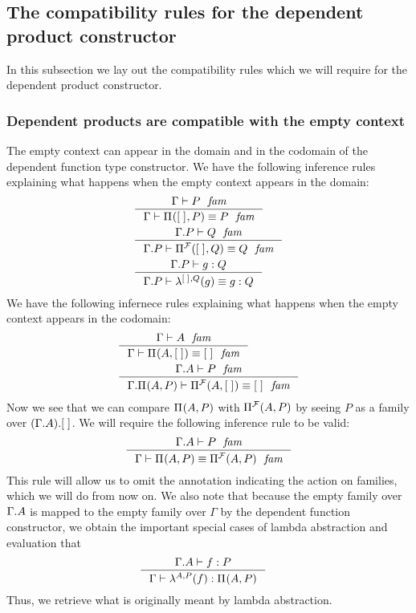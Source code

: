 \subsection{The compatibility rules for the dependent product constructor}
In this subsection we lay out the compatibility rules which we will require
for the dependent product constructor.

\subsubsection{Dependent products are compatible with the empty context}
The empty context can appear in the domain and in the codomain of the dependent
function type constructor. We have the following inference rules explaining
what happens when the empty context appears in the domain:
\begin{align}
& \inference
    { \jfam{\Gamma}{P}
      }
    { \jfameq{\Gamma}{\mprd{\emptyf}{P}}{P}
      }
  \\
& \inference
    { \jfam{{\Gamma}{P}}{Q}
      }
    { \jfameq{{\Gamma}{P}}{\mprd[\famsym]{\emptyf}{Q}}{Q}
      }
  \\
& \inference
    { \jterm{{\Gamma}{P}}{Q}{g}
      }
    { \jtermeq{{\Gamma}{P}}{Q}{\slam{\emptyf}{Q}{g}}{g}
      }
\end{align}
We have the following infernece rules explaining what happens when the empty
context appears in the codomain:
\begin{align}
& \inference
    { \jfam{\Gamma}{A}
      }
    { \jfameq{\Gamma}{\mprd{A}{\emptyf}}{\emptyf}
      }
  \\
& \inference
    { \jfam{{\Gamma}{A}}{P}
      }
    { \jfameq{{\Gamma}{\mprd{A}{P}}}{\mprd[\famsym]{A}{\emptyf}}{\emptyf}
      }
\end{align}
Now we see that we can compare $\mprd{A}{P}$ with $\mprd[\famsym]{A}{P}$ by
seeing $P$ as a family over $\ctxext{{\Gamma}{A}}{\emptyf}$. We will require
the following inference rule to be valid:
\begin{equation}
\inference
  { \jfam{{\Gamma}{A}}{P}
    }
  { \jfameq{\Gamma}{\mprd{A}{P}}{\mprd[\famsym]{A}{P}}
    }
\end{equation}
This rule will allow us to omit the annotation indicating the action on families,
which we will do from now on. We also note that because the empty family over
$\ctxext{\Gamma}{A}$ is mapped to the empty family over $\Gamma$ by the
dependent function constructor, we obtain the important special cases of
lambda abstraction and evaluation that
\begin{align*}
& \inference
  { \jterm{{\Gamma}{A}}{P}{f}
    }
  { \jterm{\Gamma}{\mprd{A}{P}}{\slam{A}{P}{f}}
    }
\end{align*}
Thus, we retrieve what is originally meant by lambda abstraction.

